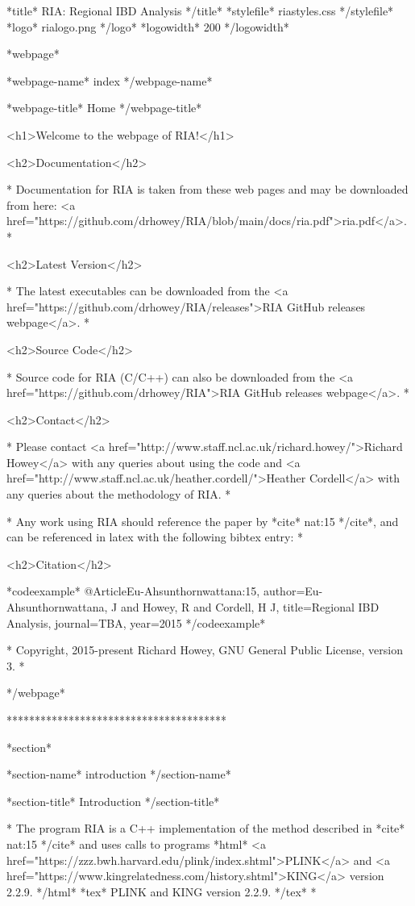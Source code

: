 *title* RIA: Regional IBD Analysis */title*
*stylefile* riastyles.css */stylefile*
*logo* rialogo.png */logo*
*logowidth* 200 */logowidth*

*webpage*

*webpage-name* index */webpage-name*

*webpage-title* Home */webpage-title*

<h1>Welcome to the webpage of RIA!</h1>

<h2>Documentation</h2>

* Documentation for RIA is taken from these web pages and may be downloaded from here: <a href="https://github.com/drhowey/RIA/blob/main/docs/ria.pdf">ria.pdf</a>. *

<h2>Latest Version</h2>

*
The latest executables can be downloaded from the <a href="https://github.com/drhowey/RIA/releases">RIA GitHub releases webpage</a>.
*

<h2>Source Code</h2>

* Source code for RIA (C/C++) can also be downloaded from the <a href="https://github.com/drhowey/RIA">RIA GitHub releases webpage</a>. *

<h2>Contact</h2>

 * Please contact <a href="http://www.staff.ncl.ac.uk/richard.howey/">Richard Howey</a> with any queries about using the code and <a href="http://www.staff.ncl.ac.uk/heather.cordell/">Heather Cordell</a> with any queries about the methodology of RIA.
  *

*  Any work using RIA should reference the paper by *cite* nat:15 */cite*, and can be referenced in latex with the following bibtex entry:  *

<h2>Citation</h2>

*codeexample*
@Article{Eu-Ahsunthornwattana:15,
author={Eu-Ahsunthornwattana, J and Howey, R and Cordell, H J},
title={{Regional IBD Analysis}},
journal={TBA},
year=2015
}
*/codeexample*

*
Copyright, 2015-present Richard Howey, GNU General Public License, version 3.
*

*/webpage*

***************************************

*section*

*section-name* introduction */section-name*

*section-title* Introduction */section-title*

*
The program RIA is a C++ implementation of the method described in *cite* nat:15 */cite* and uses calls to programs *html* <a href="https://zzz.bwh.harvard.edu/plink/index.shtml">PLINK</a> and <a href="https://www.kingrelatedness.com/history.shtml">KING</a> version 2.2.9. */html* *tex* PLINK and KING version 2.2.9. */tex*
*

